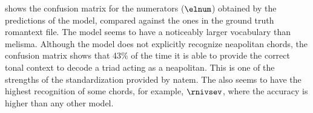 
 shows the confusion
matrix for the numerators ($\elnum$) obtained by the
predictions of the \textcite{chen2021attend} model, compared
against the ones in the ground truth \gls{romantext} file.
The \textcite{chen2021attend} model seems to have a
noticeably larger vocabulary than \gls{melisma}. Although
the model does not explicitly recognize \gls{neapolitan}
chords, the confusion matrix shows that 43\% of the time it
is able to provide the correct tonal context to decode a
triad acting as a \gls{neapolitan}. This is one of the
strengths of the standardization provided by \gls{natem}.
The \textcite{chen2021attend} also seems to have the highest
recognition of some chords, for example, $\rnivsev$, where
the accuracy is higher than any other model.


